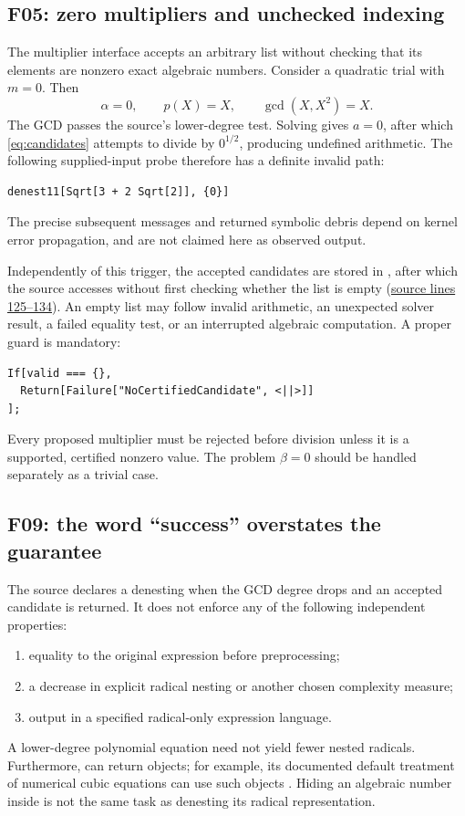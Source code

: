 \documentclass[11pt,letterpaper]{article}
\newcommand{\code}[1]{\texttt{\detokenize{#1}}}
\newcommand{\src}[1]{\hyperref[app:source]{source lines #1}}
\theoremstyle{definition}
\theoremstyle{remark}
\begin{document}
\subsection{F05: zero multipliers and unchecked indexing}
The multiplier interface accepts an arbitrary list without checking that its
elements are nonzero exact algebraic numbers. Consider a quadratic trial with
$m=0$. Then
\[
 \alpha=0,\qquad p(X)=X,\qquad
 \gcd(X,X^2)=X.
\]
The GCD passes the source's lower-degree test. Solving gives $a=0$, after which
\eqref{eq:candidates} attempts to divide by $0^{1/2}$, producing undefined
arithmetic. The following supplied-input probe therefore has a definite
invalid path:
\begin{lstlisting}
denest11[Sqrt[3 + 2 Sqrt[2]], {0}]
\end{lstlisting}
The precise subsequent messages and returned symbolic debris depend on kernel
error propagation, and are not claimed here as observed output.

Independently of this trigger, the accepted candidates are stored in
\code{result}, after which the source accesses \code{result[[1]]} without first
checking whether the list is empty (\src{125--134}). An empty list may follow
invalid arithmetic, an unexpected solver result, a failed equality test, or
an interrupted algebraic computation. A proper guard is mandatory:
\begin{lstlisting}
If[valid === {},
  Return[Failure["NoCertifiedCandidate", <||>]]
];
\end{lstlisting}
Every proposed multiplier must be rejected before division unless it is a
supported, certified nonzero value. The problem $\beta=0$ should be handled
separately as a trivial case.

\subsection{F09: the word ``success'' overstates the guarantee}
The source declares a denesting when the GCD degree drops and an accepted
candidate is returned. It does not enforce any of the following independent
properties:
\begin{enumerate}
\item equality to the original expression before preprocessing;
\item a decrease in explicit radical nesting or another chosen complexity
measure;
\item output in a specified radical-only expression language.
\end{enumerate}
A lower-degree polynomial equation need not yield fewer nested radicals.
Furthermore, \code{Solve} can return \code{Root} objects; for example, its
documented default treatment of numerical cubic equations can use such
objects \cite{solve}. Hiding an algebraic number inside \code{Root} is not the
same task as denesting its radical representation.
\end{document}
